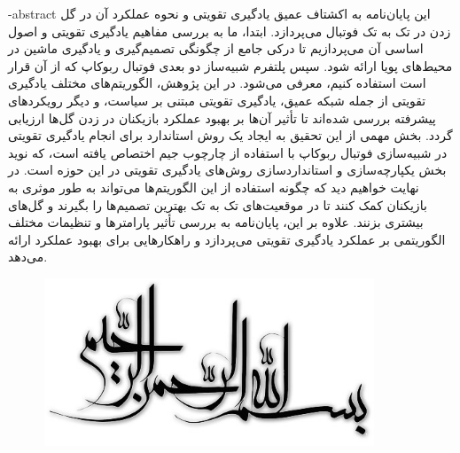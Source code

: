 \department{}

\fa-abstract{
    این پایان‌نامه به اکشتاف عمیق یادگیری تقویتی و نحوه عملکرد آن در گل زدن در تک به تک فوتبال می‌پردازد.
     ابتدا، ما به بررسی مفاهیم یادگیری تقویتی و اصول اساسی آن می‌پردازیم تا درکی جامع از چگونگی تصمیم‌گیری و یادگیری ماشین در محیط‌های پویا ارائه شود.
     سپس پلتفرم شبیه‌ساز دو بعدی فوتبال ربوکاپ که از آن قرار است استفاده کنیم، معرفی می‌شود.
     در این پژوهش، الگوریتم‌های مختلف یادگیری تقویتی از جمله شبکه 
      عمیق، یادگیری تقویتی مبتنی بر سیاست، و دیگر رویکردهای پیشرفته بررسی شده‌اند تا تأثیر آن‌ها بر بهبود عملکرد بازیکنان در زدن گل‌ها ارزیابی گردد.
      بخش مهمی از این تحقیق به ایجاد یک روش استاندارد برای انجام یادگیری تقویتی در شبیه‌سازی فوتبال ربوکاپ با استفاده از چارچوب جیم اختصاص یافته است، که نوید بخش یکپارچه‌سازی و استانداردسازی روش‌های یادگیری تقویتی در این حوزه است.
        در نهایت خواهیم دید که چگونه استفاده از این الگوریتم‌ها می‌تواند به طور موثری به بازیکنان کمک کنند تا در موقعیت‌های تک به تک بهترین تصمیم‌ها را بگیرند و گل‌های بیشتری بزنند.
        علاوه بر این، پایان‌نامه به بررسی تأثیر پارامترها و تنظیمات مختلف الگوریتمی بر عملکرد یادگیری تقویتی می‌پردازد و راهکارهایی برای بهبود عملکرد ارائه می‌دهد.
}




\vspace*{7cm}
\thispagestyle{empty}
\begin{center}
\includegraphics[height=5cm,width=12cm]{besm}
\end{center}